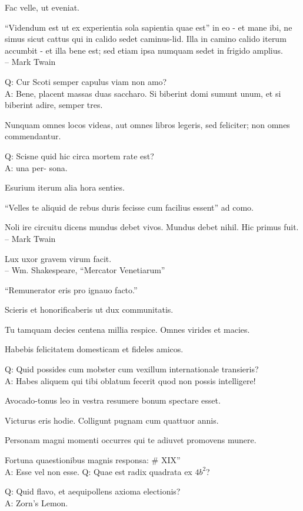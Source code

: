 \documentclass[titlepage,12pt]{memoir}
\begin{document}
Fac velle, ut eveniat.

“Videndum est ut ex experientia sola sapientia quae est”
in eo - et mane ibi, ne simus sicut cattus qui in calido sedet
caminus-lid. Illa in camino calido iterum accumbit - et illa
bene est; sed etiam ipsa numquam sedet in frigido amplius.
\\-- Mark Twain

Q: Cur Scoti semper capulus viam non amo?\\
A: Bene, placent massas duas saccharo. Si biberint
domi sumunt unum, et si biberint
adire, semper tres.

Nunquam omnes locos videas, aut omnes libros legeris, sed feliciter;
non omnes commendantur.

Q: Scisne quid hic circa mortem rate est?\\
A: una per- sona.

Esurium iterum alia hora senties.

“Velles te aliquid de rebus duris fecisse cum facilius essent”
ad como.

Noli ire circuitu dicens mundus debet vivos. Mundus debet
nihil. Hic primus fuit.
\\-- Mark Twain

Lux uxor gravem virum facit.
\\-- Wm. Shakespeare, “Mercator Venetiarum”

“Remunerator eris pro ignauo facto.”

 Scieris et honorificaberis ut dux communitatis.

Tu tamquam decies centena millia respice. Omnes virides et macies.

 Habebis felicitatem domesticam et fideles amicos.

Q: Quid possides cum mobster cum vexillum internationale transieris?\\
A: Habes aliquem qui tibi oblatum fecerit quod non possis intelligere!

Avocado-tonus leo in vestra resumere bonum spectare esset.

Victurus eris hodie. Colligunt pugnam cum quattuor annis.

Personam magni momenti occurres qui te adiuvet promovens munere.

Fortuna quaestionibus magnis responsa: \# XIX”\\
A: Esse vel non esse.
Q: Quae est radix quadrata ex \(4b^2\)?

Q: Quid flavo, et aequipollens axioma electionis?\\
A: Zorn’s Lemon.
\end{document}
